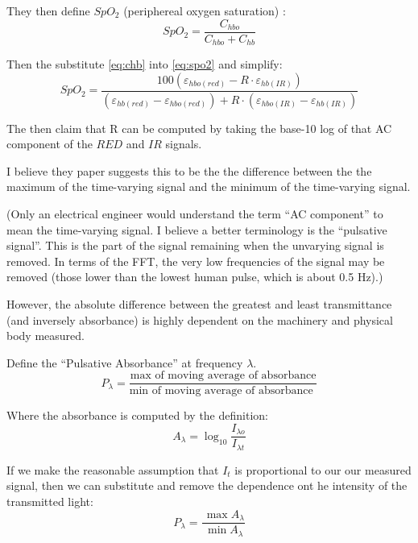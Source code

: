 \documentclass[11pt]{article}
\renewcommand{\min}{\expandafter\,\operatorname*{min}}
\renewcommand{\max}{\expandafter\,\operatorname*{max}}
\begin{document}
They then define $SpO_2$ (periphereal oxygen saturation)
\cite{wiki:SpO2,wiki:oxygensaturation}:
\begin{equation}
  \label{eq:spo2}
  SpO_2 = \frac{C_{hbo}}{C_{hbo} + C_{hb}}
\end{equation}

Then the substitute \ref{eq:chb} into \ref{eq:spo2} and simplify:
\begin{equation}
  SpO_2 = \frac{100 (\varepsilon_{hbo(red)} - R \cdot \varepsilon_{hb(IR)})}
  {(\varepsilon_{hb(red)} - \varepsilon_{hbo(red)}) + R \cdot(\varepsilon_{hbo(IR)} - \varepsilon_{hb(IR)})}
\end{equation}

The then claim that R can be computed by taking the base-10 log of that AC 
component of the $RED$ and $IR$ signals.

I believe they paper suggests this to be the the difference between the the maximum
of the time-varying signal and the minimum of the time-varying signal.

(Only an electrical engineer would understand the term ``AC component'' to
mean the time-varying signal. I believe a better terminology is the
``pulsative signal''. This is the part of the signal remaining when the
unvarying signal is removed. In terms of the FFT, the very low frequencies
of the signal may be removed (those lower than the lowest human pulse, which
is about 0.5 Hz).)

However, the absolute difference between the greatest and least
transmittance (and inversely absorbance) is highly dependent on the
machinery and physical body measured.

Define the ``Pulsative Absorbance'' at frequency $\lambda$. 
\begin{equation}
  P_{\lambda} = \frac{\text{max of moving average of absorbance}}
  {\text{min of moving average of absorbance }}
\end{equation}

Where the absorbance is computed by the definition:
\begin{equation}
 A_{\lambda} = \log_{10} \frac{I_{\lambda o}}{I_{\lambda t}}   
\end{equation}

If we make the reasonable assumption that $I_t$ is proportional
to our our measured signal, then we can substitute and
remove the dependence ont he intensity of the transmitted light:
\begin{equation}
  P_{\lambda} = \frac{\max{A_{\lambda}}}
  {\min{A_{\lambda}}}
\end{equation}
\end{document}
